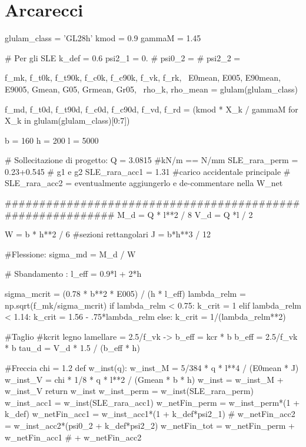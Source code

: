 \section{Arcarecci}
\begin{pycode}[arcarecci]
glulam_class = 'GL28h'
kmod = 0.9
gammaM = 1.45

# Per gli SLE
k_def = 0.6
psi2_1 = 0.
# psi0_2 =
# psi2_2 =

f_mk, f_t0k, f_t90k, f_c0k, f_c90k, f_vk, f_rk, \
E0mean, E005, E90mean, E9005, Gmean, G05, Grmean, Gr05, \
rho_k, rho_mean = glulam(glulam_class)

f_md, f_t0d, f_t90d, f_c0d, f_c90d, f_vd, f_rd = (kmod * X_k / gammaM for X_k in glulam(glulam_class)[0:7])

b = 160
h = 200
l = 5000

# Sollecitazione di progetto:
Q = 3.0815 #kN/m == N/mm
SLE_rara_perm = 0.23+0.545 # g1 e g2
SLE_rara_acc1 = 1.31 #carico accidentale principale
# SLE_rara_acc2 =  eventualmente aggiungerlo e de-commentare nella W_net


###########################################################
M_d = Q * l**2 / 8
V_d = Q *l / 2

W = b * h**2 / 6 #sezioni rettangolari
J = b*h**3 / 12

#Flessione:
sigma_md = M_d / W

# Sbandamento :
l_eff = 0.9*l + 2*h 

sigma_mcrit = (0.78 * b**2 * E005) / (h * l_eff) 
lambda_relm = np.sqrt(f_mk/sigma_mcrit)
if lambda_relm < 0.75:
    k_crit = 1
elif lambda_relm < 1.14:
    k_crit = 1.56 - .75*lambda_relm
else:
    k_crit = 1/(lambda_relm**2)

#Taglio    
#kcrit legno lamellare = 2.5/f_vk -> b_eff = kcr * b
b_eff = 2.5/f_vk * b
tau_d = V_d * 1.5 / (b_eff * h)

#Freccia
chi = 1.2
def w_inst(q): 
    w_inst_M = 5/384 * q * l**4 / (E0mean * J)
    w_inst_V = chi * 1/8 * q * l**2 / (Gmean * b * h)
    w_inst = w_inst_M + w_inst_V
    return w_inst
w_inst_perm = w_inst(SLE_rara_perm)
w_inst_acc1 = w_inst(SLE_rara_acc1)
w_netFin_perm = w_inst_perm*(1 + k_def)
w_netFin_acc1 = w_inst_acc1*(1 + k_def*psi2_1)
# w_netFin_acc2 = w_inst_acc2*(psi0_2 + k_def*psi2_2)
w_netFin_tot = w_netFin_perm + w_netFin_acc1 # + w_netFin_acc2

\end{pycode}

